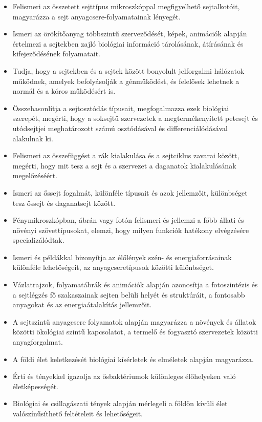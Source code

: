\begin{itemize}
\item
  Felismeri az összetett sejttípus mikroszkóppal megfigyelhető
  sejtalkotóit, magyarázza a sejt anyagcsere-folyamatainak lényegét.
\item
  Ismeri az örökítőanyag többszintű szerveződését, képek, animációk
  alapján értelmezi a sejtekben zajló biológiai információ tárolásának,
  átírásának és kifejeződésének folyamatait.
\item
  Tudja, hogy a sejtekben és a sejtek között bonyolult jelforgalmi
  hálózatok működnek, amelyek befolyásolják a génműködést, és felelősek
  lehetnek a normál és a kóros működésért is.
\item
  Összehasonlítja a sejtosztódás típusait, megfogalmazza ezek biológiai
  szerepét, megérti, hogy a soksejtű szervezetek a megtermékenyített
  petesejt és utódsejtjei meghatározott számú osztódásával és
  differenciálódásával alakulnak ki.
\item
  Felismeri az összefüggést a rák kialakulása és a sejtciklus zavarai
  között, megérti, hogy mit tesz a sejt és a szervezet a daganatok
  kialakulásának megelőzéséért.
\item
  Ismeri az őssejt fogalmát, különféle típusait és azok jellemzőit,
  különbséget tesz őssejt és daganatsejt között.
\item
  Fénymikroszkópban, ábrán vagy fotón felismeri és jellemzi a főbb
  állati és növényi szövettípusokat, elemzi, hogy milyen funkciók
  hatékony elvégzésére specializálódtak.
\item
  Ismeri és példákkal bizonyítja az élőlények szén- és
  energiaforrásainak különféle lehetőségeit, az anyagcseretípusok
  közötti különbséget.
\item
  Vázlatrajzok, folyamatábrák és animációk alapján azonosítja a
  fotoszintézis és a sejtlégzés fő szakaszainak sejten belüli helyét és
  struktúráit, a fontosabb anyagokat és az energiaátalakítás jellemzőit.
\item
  A sejtszintű anyagcsere folyamatok alapján magyarázza a növények és
  állatok közötti ökológiai szintű kapcsolatot, a termelő és fogyasztó
  szervezetek közötti anyagforgalmat.
\item
  A földi élet keletkezését biológiai kísérletek és elméletek alapján
  magyarázza.
\item
  Érti és tényekkel igazolja az ősbaktériumok különleges élőhelyeken
  való életképességét.
\item
  Biológiai és csillagászati tények alapján mérlegeli a földön kívüli
  élet valószínűsíthető feltételeit és lehetőségeit.

\end{itemize}
